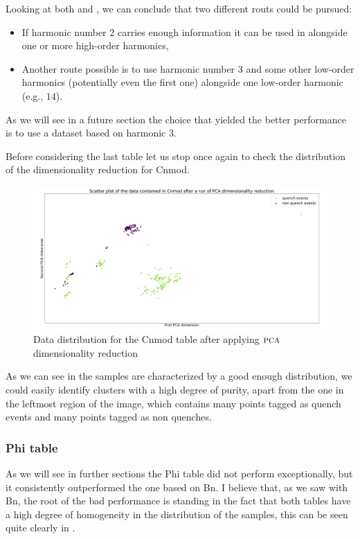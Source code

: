 Looking at both  and , we can conclude that two different
routs could be pursued:
\begin{itemize}
	\item If harmonic number $2$ carries enough information it can be used in alongside one or
	      more high-order harmonics,
	\item Another route possible is to use harmonic number $3$ and some other low-order
	      harmonics (potentially even the first one) alongside one low-order harmonic (e.g.,
	      $14$).
\end{itemize}
As we will see in a future section the choice that yielded the better performance is to use a
dataset based on harmonic $3$.

Before considering the last table let us stop once again to check the distribution of the
dimensionality reduction for Cnmod.
\begin{figure}[h!]
	\centering
	\includegraphics[scale=.2]{img/Cnmod_distribution.png}
	\caption{Data distribution for the Cnmod table after applying $\textsc{pca}$ dimensionality
		reduction} \label{fig:cnmod-dist}
\end{figure}
As we can see in  the samples are characterized by a good enough distribution,
we could easily identify clusters with a high degree of purity, apart from the one in the leftmost
region of the image, which contains many points tagged as quench events and many points tagged as
non quenches.

\subsubsection{Phi table}
As we will see in further sections the Phi table did not perform exceptionally, but it consistently
outperformed the one based on Bn. I believe that, as we saw with Bn, the root of the bad performance
is standing in the fact that both tables have a high degree of homogeneity in the distribution of
the samples, this can be seen quite clearly in .

